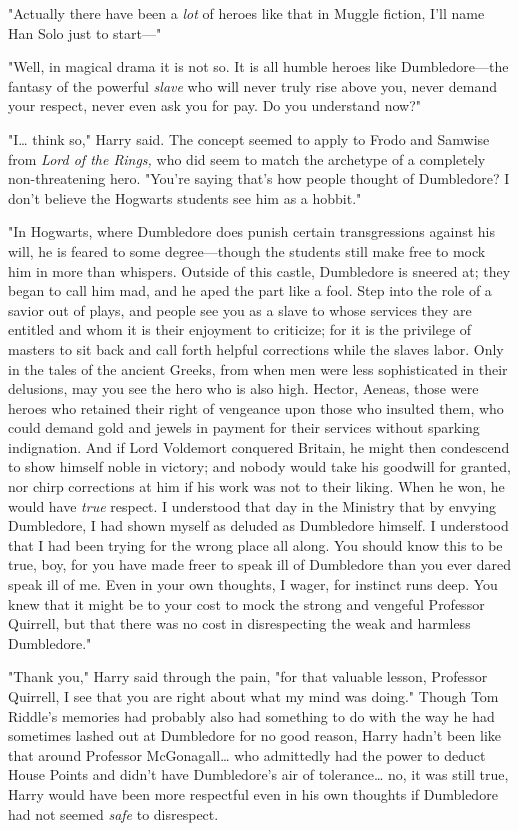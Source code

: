 "Actually there have been a \emph{lot} of heroes like that in Muggle fiction, 
I'll name Han Solo just to start---"

"Well, in magical drama it is not so. It is all humble heroes like 
Dumbledore---the fantasy of the powerful \emph{slave} who will never truly rise 
above you, never demand your respect, never even ask you for pay. Do you 
understand now?"

"I{\ldots} think so," Harry said. The concept seemed to apply to Frodo and 
Samwise from \emph{Lord of the Rings,} who did seem to match the archetype of a 
completely non-threatening hero. "You're saying that's how people thought of 
Dumbledore? I don't believe the Hogwarts students see him as a hobbit."

"In Hogwarts, where Dumbledore does punish certain transgressions against his 
will, he is feared to some degree---though the students still make free to mock 
him in more than whispers. Outside of this castle, Dumbledore is sneered at; 
they began to call him mad, and he aped the part like a fool. Step into the 
role of a savior out of plays, and people see you as a slave to whose services 
they are entitled and whom it is their enjoyment to criticize; for it is the 
privilege of masters to sit back and call forth helpful corrections while the 
slaves labor. Only in the tales of the ancient Greeks, from when men were less 
sophisticated in their delusions, may you see the hero who is also high. 
Hector, Aeneas, those were heroes who retained their right of vengeance upon 
those who insulted them, who could demand gold and jewels in payment for their 
services without sparking indignation. And if Lord Voldemort conquered Britain, 
he might then condescend to show himself noble in victory; and nobody would 
take his goodwill for granted, nor chirp corrections at him if his work was not 
to their liking. When he won, he would have \emph{true} respect. I understood 
that day in the Ministry that by envying Dumbledore, I had shown myself as 
deluded as Dumbledore himself. I understood that I had been trying for the 
wrong place all along. You should know this to be true, boy, for you have made 
freer to speak ill of Dumbledore than you ever dared speak ill of me. Even in 
your own thoughts, I wager, for instinct runs deep. You knew that it might be 
to your cost to mock the strong and vengeful Professor Quirrell, but that there 
was no cost in disrespecting the weak and harmless Dumbledore."

"Thank you," Harry said through the pain, "for that valuable lesson, Professor 
Quirrell, I see that you are right about what my mind was doing." Though Tom 
Riddle's memories had probably also had something to do with the way he had 
sometimes lashed out at Dumbledore for no good reason, Harry hadn't been like 
that around Professor McGonagall{\ldots} who admittedly had the power to deduct 
House Points and didn't have Dumbledore's air of tolerance{\ldots} no, it was 
still true, Harry would have been more respectful even in his own thoughts if 
Dumbledore had not seemed \emph{safe} to disrespect.

